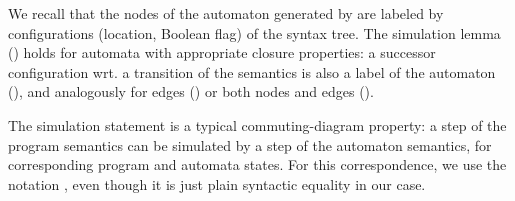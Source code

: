 \begin{isabellebody}
{\isafoldproof}\isadelimproof
\endisadelimproof
\isadelimproof
\endisadelimproof
\isatagproof
\endisatagproof
{\isafoldproof}\isadelimproof
\endisadelimproof
\isadelimproof
\endisadelimproof
\isatagproof
\endisatagproof
{\isafoldproof}\isadelimproof
\endisadelimproof
\isadelimproof
\endisadelimproof
\isatagproof
\endisatagproof
{\isafoldproof}\isadelimproof
\endisadelimproof
\isadelimproof
\endisadelimproof
\isatagproof
\endisatagproof
{\isafoldproof}\isadelimproof
\endisadelimproof
\isadelimproof
\endisadelimproof
\isatagproof
\endisatagproof
{\isafoldproof}\isadelimproof
\endisadelimproof
\isadelimproof
\endisadelimproof
\isatagproof
\endisatagproof
{\isafoldproof}\isadelimproof
\endisadelimproof
\isadelimproof
\endisadelimproof
\isatagproof
\endisatagproof
{\isafoldproof}\isadelimproof
\endisadelimproof
\isadelimproof
\endisadelimproof
\isatagproof
\endisatagproof
{\isafoldproof}\isadelimproof
\endisadelimproof
{}
\isamarkuptrue \begin{isamarkuptext}We recall that the nodes of the automaton generated by  are labeled by configurations (location, Boolean flag) of the
syntax tree. The simulation lemma () holds for
automata with appropriate closure properties: a successor configuration wrt.{}
a transition of the semantics is also a label of the automaton (), and analogously for edges () or both nodes and edges 
().\end{isamarkuptext}\isamarkuptrue \isadelimproof
\endisadelimproof
\isatagproof
\endisatagproof
{\isafoldproof}\isadelimproof
\endisadelimproof
\begin{isamarkuptext}The simulation statement is a typical commuting-diagram property: a
step of the program semantics can be simulated by a step of the automaton
semantics, for corresponding program and automata states. For this
correspondence, we use the notation \isa{{\isasymapprox}}, even though it is just plain
syntactic equality in our case.
\begin{lemma}\label{th:simulation_sem_aut}
\mbox{}\newline

\end{lemma}
\end{isamarkuptext}
\end{isabellebody}
